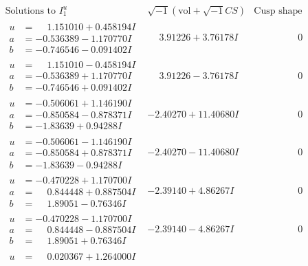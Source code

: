 \documentclass[1p]{elsarticle_modified}
\theoremstyle{definition}
\newcommand{\I}{\sqrt{-1}}
\begin{document}
$$\begin{array}{c|c|c}
\text{Solutions to }I^u_{1}& \I (\text{vol} + \sqrt{-1}CS) & \text{Cusp shape}\\
 \hline 
\begin{aligned}
u &= \phantom{-}1.151010 + 0.458194 I \\
a &= -0.536389 - 1.170770 I \\
b &= -0.746546 - 0.091402 I\end{aligned}
 & \phantom{-}3.91226 + 3.76178 I & \phantom{-0.000000 } 0 \\ \hline\begin{aligned}
u &= \phantom{-}1.151010 - 0.458194 I \\
a &= -0.536389 + 1.170770 I \\
b &= -0.746546 + 0.091402 I\end{aligned}
 & \phantom{-}3.91226 - 3.76178 I & \phantom{-0.000000 } 0 \\ \hline\begin{aligned}
u &= -0.506061 + 1.146190 I \\
a &= -0.850584 - 0.878371 I \\
b &= -1.83639 + 0.94288 I\end{aligned}
 & -2.40270 + 11.40680 I & \phantom{-0.000000 } 0 \\ \hline\begin{aligned}
u &= -0.506061 - 1.146190 I \\
a &= -0.850584 + 0.878371 I \\
b &= -1.83639 - 0.94288 I\end{aligned}
 & -2.40270 - 11.40680 I & \phantom{-0.000000 } 0 \\ \hline\begin{aligned}
u &= -0.470228 + 1.170700 I \\
a &= \phantom{-}0.844448 + 0.887504 I \\
b &= \phantom{-}1.89051 - 0.76346 I\end{aligned}
 & -2.39140 + 4.86267 I & \phantom{-0.000000 } 0 \\ \hline\begin{aligned}
u &= -0.470228 - 1.170700 I \\
a &= \phantom{-}0.844448 - 0.887504 I \\
b &= \phantom{-}1.89051 + 0.76346 I\end{aligned}
 & -2.39140 - 4.86267 I & \phantom{-0.000000 } 0 \\ \hline\begin{aligned}
u &= \phantom{-}0.020367 + 1.264000 I \\

\end{aligned}
\end{array}$$
\end{document}
